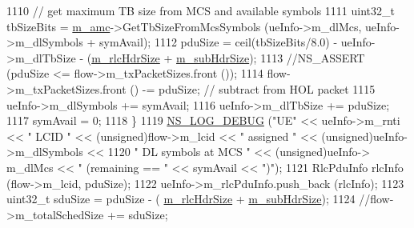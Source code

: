 \begin{DoxyCode}
1110                                                         \textcolor{comment}{// get maximum TB size from MCS and available
       symbols}
1111                                                         uint32\_t tbSizeBits = 
      \hyperlink{classns3_1_1MmWaveFlexTtiMaxWeightMacScheduler_a36c22ad89fe5d6743a058f253a43a70d}{m\_amc}->GetTbSizeFromMcsSymbols (ueInfo->m\_dlMcs, ueInfo->m\_dlSymbols + symAvail);
1112                                                         pduSize = ceil(tbSizeBits/8.0) - ueInfo->m\_dlTbSize
       - (\hyperlink{classns3_1_1MmWaveFlexTtiMaxWeightMacScheduler_a12646efe5a10dfd27c8839b224b2ed53}{m\_rlcHdrSize} + \hyperlink{classns3_1_1MmWaveFlexTtiMaxWeightMacScheduler_a0f66f1575529b6532871202961e92c86}{m\_subHdrSize});
1113                                                         \textcolor{comment}{//NS\_ASSERT (pduSize <= flow->m\_txPacketSizes.front
       ());}
1114                                                         flow->m\_txPacketSizes.front () -= pduSize;              \textcolor{comment}{
      // subtract from HOL packet}
1115                                                         ueInfo->m\_dlSymbols += symAvail;
1116                                                         ueInfo->m\_dlTbSize += pduSize;
1117                                                         symAvail = 0;
1118                                                 \}
1119                                                 \hyperlink{group__logging_ga413f1886406d49f59a6a0a89b77b4d0a}{NS\_LOG\_DEBUG} (\textcolor{stringliteral}{"UE"} << ueInfo->m\_rnti << \textcolor{stringliteral}{" LCID 
      "} << (\textcolor{keywordtype}{unsigned})flow->m\_lcid << \textcolor{stringliteral}{" assigned "} << (\textcolor{keywordtype}{unsigned})ueInfo->m\_dlSymbols <<
1120                                                               \textcolor{stringliteral}{" DL symbols at MCS "} << (\textcolor{keywordtype}{unsigned})ueInfo->
      m\_dlMcs << \textcolor{stringliteral}{" (remaining == "} << symAvail << \textcolor{stringliteral}{")"});
1121                                                 RlcPduInfo rlcInfo (flow->m\_lcid, pduSize);
1122                                                 ueInfo->m\_rlcPduInfo.push\_back (rlcInfo);
1123                                                 uint32\_t sduSize = pduSize - (
      \hyperlink{classns3_1_1MmWaveFlexTtiMaxWeightMacScheduler_a12646efe5a10dfd27c8839b224b2ed53}{m\_rlcHdrSize} + \hyperlink{classns3_1_1MmWaveFlexTtiMaxWeightMacScheduler_a0f66f1575529b6532871202961e92c86}{m\_subHdrSize});
1124                                                 \textcolor{comment}{//flow->m\_totalSchedSize += sduSize;}

\end{DoxyCode}
